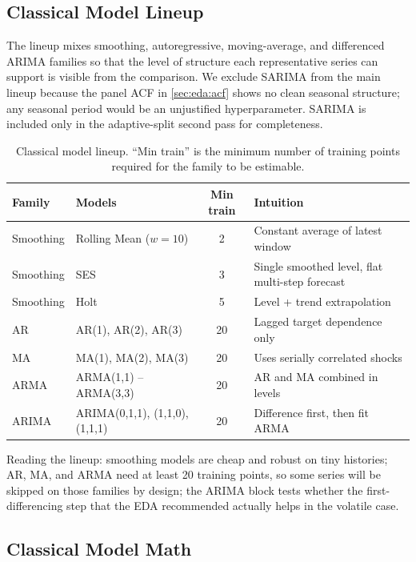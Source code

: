 \subsection{Classical Model Lineup}
\label{sec:classical:lineup}

The lineup mixes smoothing, autoregressive, moving-average, and differenced ARIMA families so that the level of structure each representative series can support is visible from the comparison. We exclude SARIMA from the main lineup because the panel ACF in \cref{sec:eda:acf} shows no clean seasonal structure; any seasonal period would be an unjustified hyperparameter. SARIMA is included only in the adaptive-split second pass for completeness.

\begin{table}[h]
\centering
\caption{Classical model lineup. ``Min train'' is the minimum number of training points required for the family to be estimable.}
\label{tab:classical_lineup}
\begin{tabular}{l l c l}
\toprule
Family & Models & Min train & Intuition \\
\midrule
Smoothing & Rolling Mean ($w{=}10$) & 2  & Constant average of latest window \\
Smoothing & SES                     & 3  & Single smoothed level, flat multi-step forecast \\
Smoothing & Holt                    & 5  & Level + trend extrapolation \\
AR        & AR(1), AR(2), AR(3)     & 20 & Lagged target dependence only \\
MA        & MA(1), MA(2), MA(3)     & 20 & Uses serially correlated shocks \\
ARMA      & ARMA(1,1) -- ARMA(3,3)  & 20 & AR and MA combined in levels \\
ARIMA     & ARIMA(0,1,1), (1,1,0), (1,1,1) & 20 & Difference first, then fit ARMA \\
\bottomrule
\end{tabular}
\end{table}

Reading the lineup: smoothing models are cheap and robust on tiny histories; AR, MA, and ARMA need at least 20 training points, so some series will be skipped on those families by design; the ARIMA block tests whether the first-differencing step that the EDA recommended actually helps in the volatile case.

\subsection{Classical Model Math}
\label{sec:classical:math}

